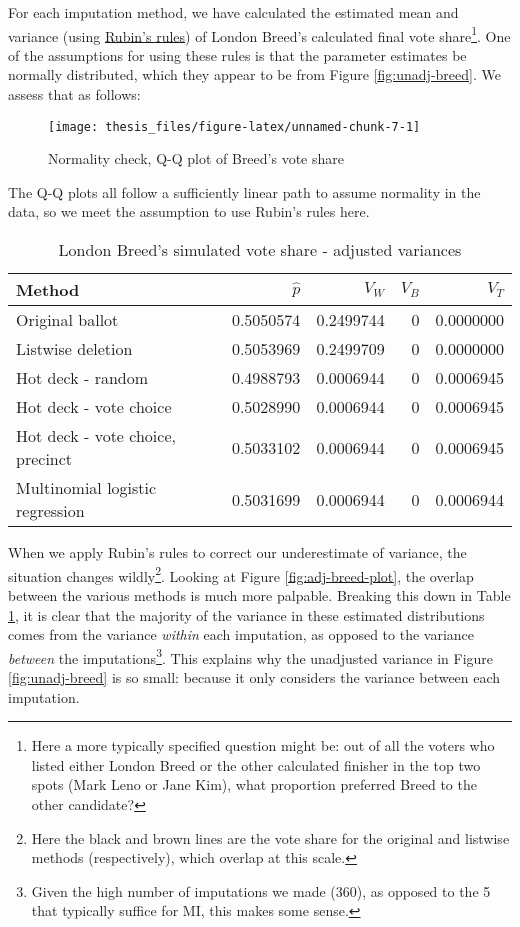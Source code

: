 \documentclass[12pt,twoside]{reedthesis}
\begin{document}
For each imputation method, we have calculated the estimated mean and variance (using \protect\hyperlink{rubins-rules}{Rubin's rules}) of London Breed's calculated final vote share\footnote{Here a more typically specified question might be: out of all the voters who listed either London Breed or the other calculated finisher in the top two spots (Mark Leno or Jane Kim), what proportion preferred Breed to the other candidate?}. One of the assumptions for using these rules is that the parameter estimates be normally distributed, which they appear to be from Figure \ref{fig:unadj-breed}. We assess that as follows:
\begin{figure}
\texttt{[image: thesis\_files/figure-latex/unnamed-chunk-7-1]} \caption{Normality check, Q-Q plot of Breed's vote share}\label{fig:unnamed-chunk-7}
\end{figure}
The Q-Q plots all follow a sufficiently linear path to assume normality in the data, so we meet the assumption to use Rubin's rules here.
\begin{table}[t]

\caption{\label{tab:adj-breed-tab}London Breed's simulated vote share - adjusted variances}
\centering
\begin{tabular}{lrrrr}
\toprule
Method & $\hat{p}$ & $V_W$ & $V_B$ & $V_T$\\
\midrule
Original ballot & 0.5050574 & 0.2499744 & 0 & 0.0000000\\
Listwise deletion & 0.5053969 & 0.2499709 & 0 & 0.0000000\\
Hot deck - random & 0.4988793 & 0.0006944 & 0 & 0.0006945\\
Hot deck - vote choice & 0.5028990 & 0.0006944 & 0 & 0.0006945\\
Hot deck - vote choice, precinct & 0.5033102 & 0.0006944 & 0 & 0.0006945\\
\addlinespace
Multinomial logistic regression & 0.5031699 & 0.0006944 & 0 & 0.0006944\\
\bottomrule
\end{tabular}
\end{table}
When we apply Rubin's rules to correct our underestimate of variance, the situation changes wildly\footnote{Here the black and brown lines are the vote share for the original and listwise methods (respectively), which overlap at this scale.}. Looking at Figure \ref{fig:adj-breed-plot}, the overlap between the various methods is much more palpable. Breaking this down in Table \ref{tab:adj-breed-tab}, it is clear that the majority of the variance in these estimated distributions comes from the variance \emph{within} each imputation, as opposed to the variance \emph{between} the imputations\footnote{Given the high number of imputations we made (360), as opposed to the 5 that typically suffice for MI, this makes some sense.}. This explains why the unadjusted variance in Figure \ref{fig:unadj-breed} is so small: because it only considers the variance between each imputation.
\end{document}
